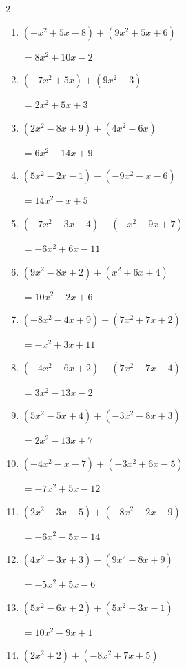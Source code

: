 \begin{multicols}{2}
\begin{enumerate}
        $=-3x^{2}-11x-16$

  \item $(-x^{2}+5x-8)+(9x^{2}+5x+6)$

        $=8x^{2}+10x-2$

  \item $(-7x^{2}+5x)+(9x^{2}+3)$

        $=2x^{2}+5x+3$

  \item $(2x^{2}-8x+9)+(4x^{2}-6x)$

        $=6x^{2}-14x+9$

  \item $(5x^{2}-2x-1)-(-9x^{2}-x-6)$

        $=14x^{2}-x+5$

  \item $(-7x^{2}-3x-4)-(-x^{2}-9x+7)$

        $=-6x^{2}+6x-11$

  \item $(9x^{2}-8x+2)+(x^{2}+6x+4)$

        $=10x^{2}-2x+6$

  \item $(-8x^{2}-4x+9)+(7x^{2}+7x+2)$

        $=-x^{2}+3x+11$

  \item $(-4x^{2}-6x+2)+(7x^{2}-7x-4)$

        $=3x^{2}-13x-2$

  \item $(5x^{2}-5x+4)+(-3x^{2}-8x+3)$

        $=2x^{2}-13x+7$

  \item $(-4x^{2}-x-7)+(-3x^{2}+6x-5)$

        $=-7x^{2}+5x-12$

  \item $(2x^{2}-3x-5)+(-8x^{2}-2x-9)$

        $=-6x^{2}-5x-14$

  \item $(4x^{2}-3x+3)-(9x^{2}-8x+9)$

        $=-5x^{2}+5x-6$

\columnbreak %

\resetques

  \item $(5x^{2}-6x+2)+(5x^{2}-3x-1)$

        $=10x^{2}-9x+1$

  \item $(2x^{2}+2)+(-8x^{2}+7x+5)$


\end{enumerate}
\end{multicols}
